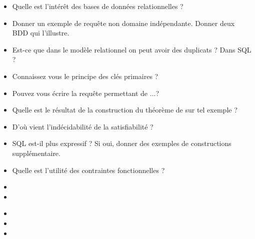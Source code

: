 \documentclass{agregfiche}
\begin{document}
\secquestionsclassiques

\begin{itemize}
    \item Quelle est l'intérêt des bases de données relationnelles ?
    \item Donner un exemple de requête non domaine indépendante.
	Donner deux BDD qui l'illustre.
    \item Est-ce que dans le modèle relationnel on peut avoir des
    duplicats ? Dans SQL ?
    \item Connaissez vous le principe des clés primaires ?
    \item Pouvez vous écrire la requête permettant de ...?
    \item Quelle est le résultat de la construction du théorème de
     sur tel exemple ?
    \item D'où vient l'indécidabilité de la satisfiabilité ?
    \item SQL est-il plus expressif ? Si oui, donner des exemples de
    constructions supplémentaire.
    \item Quelle est l'utilité des contraintes fonctionnelles ?
\end{itemize}

\secreferences

\begin{itemize}
\item 
\item 
\end{itemize}

\secdev

\begin{itemize}
\item 
\item 
\item 
\end{itemize}
\end{document}
